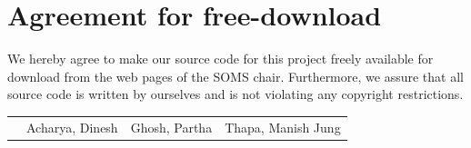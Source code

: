 \documentclass[11pt]{article}
\begin{document}

\newpage


\newpage
\section*{Agreement for free-download}
\bigskip


\bigskip

\large We hereby agree to make our source code for this project freely available for download from the web pages of the SOMS chair. Furthermore, we assure that all source code is written by ourselves and is not violating any copyright restrictions.

\begin{center}

\bigskip


\bigskip

\bigskip

\begin{tabular}{@{}p{1cm}@{}p{5cm}@{}@{}p{5cm}@{}@{}p{5cm}}
\begin{minipage}{0cm}

\end{minipage}
&
\begin{minipage}{6cm}
\large Acharya, Dinesh


\end{minipage}
&
\begin{minipage}{6cm}

\large Ghosh, Partha

\end{minipage}
&
\begin{minipage}{6cm}

\large Thapa, Manish Jung

\end{minipage}
\end{tabular}


\end{center}
\newpage




\end{document}
